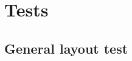 \documentclass{tufte-book}
\begin{document}
\part{Tests}
\chapter{General layout test}

\end{document}
